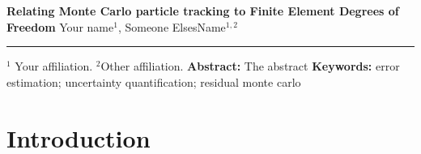 \documentclass[10pt,letterpaper,notitlepage]{article}
\numberwithin{equation}{section}
\newcommand{\DOCTITLE}{Relating Monte Carlo particle tracking to Finite Element Degrees of Freedom
}
\begin{document}
\noindent
{\LARGE\textbf{\DOCTITLE}}
\newline
\newline
\newline
\noindent
{\Large Your name${^1}$, Someone ElsesName$^{1,2}$}
\newline
\noindent\rule{\textwidth}{1pt}
{\small $^1$ Your affiliation.}
\newline\noindent
{\small $^2$Other affiliation.}
\newline
\newline
\textbf{Abstract:}\newline\noindent
The abstract
\newline
\newline\noindent
{\small
\textbf{Keywords:} error estimation; uncertainty quantification; residual monte carlo}

\section{Introduction}
\end{document}
